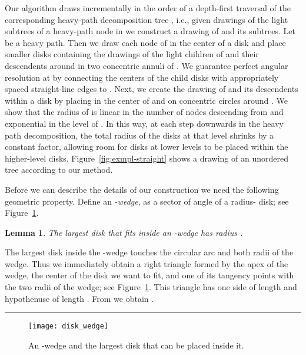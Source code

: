 \documentclass[11pt]{article}
\newtheorem{lemma}{Lemma}
\newcommand{\qed}{\hspace*{\fill}\rule{6pt}{6pt}}
\newenvironment{proof}{\noindent{\bf Proof:}}{\bigskip} \makeatletter
\newcommand{\highlight}[1]{{\itshape #1}}
\begin{document}
Our algorithm draws  incrementally in the order of a depth-first
traversal of the corresponding heavy-path decomposition tree ,
i.e., given drawings of the light subtrees of a heavy-path node  in
 we construct a drawing of  and its subtrees. Let  be a heavy path. Then we draw each node  of  in
the center of a disk  and place smaller disks containing the
drawings of the light children of  and their descendents around
 in two concentric annuli of . We guarantee perfect angular
resolution at  by connecting the centers of the child disks with
appropriately spaced straight-line edges to . Next, we create the
drawing of  and its descendents within a disk  by placing 
in the center of  and  on concentric circles
around . We show that the radius of  is linear in the number
 of nodes descending from  and exponential in the level of
. In this way, at each step downwards in the heavy path
decomposition, the total radius of the disks at that level shrinks by
a constant factor, allowing room for disks at lower levels to be
placed within the higher-level disks. Figure~\ref{fig:exmpl-straight}
shows a drawing of an unordered tree according to our method.


Before we can describe the details of our construction we need the
following geometric property.  Define an
\highlight{-wedge},  as a sector of angle
 of a radius- disk; see Figure~\ref{fig:circleFit}.

\begin{lemma}
\label{lemma:circleFit}
The largest disk that fits inside an -wedge has
radius .
\end{lemma}

\begin{proof}
  The largest disk inside the -wedge
  touches the circular arc and both radii of the wedge. Thus we
  immediately obtain a right triangle formed by the apex of the wedge,
  the center of the disk we want to fit, and one of its tangency
  points with the two radii of the wedge; see
  Figure~\ref{fig:circleFit}. This triangle has one side of length 
  and hypothenuse of length . From  we
  obtain . \qed
  \begin{figure}[htb]
    \centering
    \texttt{[image: disk\_wedge]}
    \caption{An
      -wedge and the largest disk that can be placed inside it.}
    \label{fig:circleFit}
  \end{figure}
\end{proof}
\end{document}
